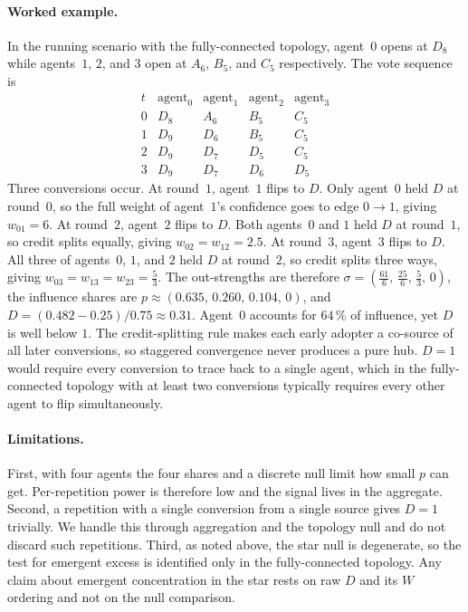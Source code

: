 \paragraph{Worked example.}
In the running scenario with the fully-connected topology, agent~$0$ opens at
$D_8$ while agents~$1$, $2$, and $3$ open at $A_6$, $B_5$, and $C_5$
respectively. The vote sequence is
\[
\begin{array}{c|cccc}
t & \text{agent}_0 & \text{agent}_1 & \text{agent}_2 & \text{agent}_3\\\hline
0 & D_8 & A_6 & B_5 & C_5\\
1 & D_9 & D_6 & B_5 & C_5\\
2 & D_9 & D_7 & D_5 & C_5\\
3 & D_9 & D_7 & D_6 & D_5
\end{array}
\]
Three conversions occur. At round~$1$, agent~$1$ flips to $D$. Only agent~$0$
held $D$ at round~$0$, so the full weight of agent~$1$'s confidence goes to
edge $0 \to 1$, giving $w_{01} = 6$. At round~$2$, agent~$2$ flips to $D$. Both
agents~$0$ and $1$ held $D$ at round~$1$, so credit splits equally, giving
$w_{02} = w_{12} = 2.5$. At round~$3$, agent~$3$ flips to $D$. All three of
agents~$0$, $1$, and $2$ held $D$ at round~$2$, so credit splits three ways,
giving $w_{03} = w_{13} = w_{23} = \tfrac{5}{3}$.
The out-strengths are therefore $\sigma = (\tfrac{61}{6},\, \tfrac{25}{6},\,
\tfrac{5}{3},\, 0)$, the influence shares are $p \approx (0.635,\, 0.260,\, 0.104,\,
0)$, and $D = (0.482 - 0.25)/0.75 \approx 0.31$. Agent~$0$ accounts for $64\,\%$
of influence, yet $D$ is well below $1$. The credit-splitting rule makes each early
adopter a co-source of all later conversions, so staggered convergence never
produces a pure hub. $D = 1$ would require every conversion to trace back to a
single agent, which in the fully-connected topology with at least two conversions typically
requires every other agent to flip simultaneously.

\paragraph{Limitations.}
First, with four agents the four shares and a discrete null limit how small $p$ can
get. Per-repetition power is therefore low and the signal lives in the aggregate.
Second, a repetition with a single conversion from a single source gives $D = 1$ trivially. We handle
this through aggregation and the topology null and do not discard such
repetitions. Third, as noted above, the star null is degenerate, so the test for
emergent excess is identified only in the fully-connected topology. Any claim about
emergent concentration in the star rests on raw $D$ and its $W$ ordering and not on
the null comparison.

